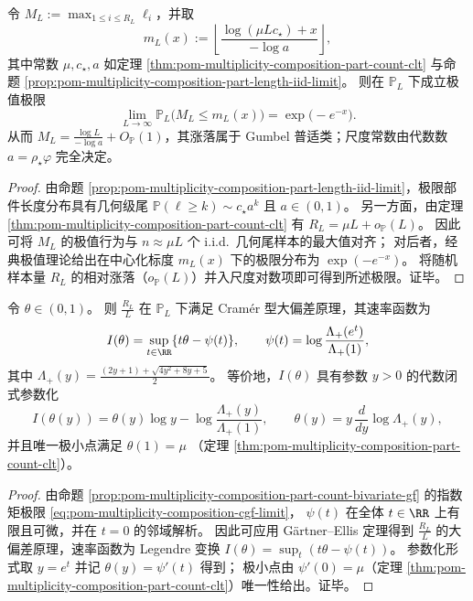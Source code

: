 \begin{theorem}\label{thm:pom-multiplicity-composition-max-part-gumbel}
令 \(M_L:=\max_{1\le i\le R_L}\ell_i\)，并取
\[
m_L(x):=\left\lfloor \frac{\log(\mu L c_\star)+x}{-\log a}\right\rfloor ,
\]
其中常数 \(\mu,c_\star,a\) 如定理 \ref{thm:pom-multiplicity-composition-part-count-clt} 与命题 \ref{prop:pom-multiplicity-composition-part-length-iid-limit}。
则在 \(\mathbb{P}_L\) 下成立极值极限
\[
\lim_{L\to\infty}\mathbb{P}_L\bigl(M_L\le m_L(x)\bigr)=\exp\bigl(-e^{-x}\bigr).
\]
从而
\(
M_L=\frac{\log L}{-\log a}+O_{\mathbb{P}}(1)
\)，其涨落属于 Gumbel 普适类；尺度常数由代数数 \(a=\rho_\star\varphi\) 完全决定。
\end{theorem}
\begin{proof}
由命题 \ref{prop:pom-multiplicity-composition-part-length-iid-limit}，极限部件长度分布具有几何级尾
\(
\mathbb{P}(\ell\ge k)\sim c_\star a^k
\) 且 \(a\in(0,1)\)。
另一方面，由定理 \ref{thm:pom-multiplicity-composition-part-count-clt} 有 \(R_L=\mu L+o_{\mathbb{P}}(L)\)。
因此可将 \(M_L\) 的极值行为与 \(n\approx \mu L\) 个 i.i.d.\ 几何尾样本的最大值对齐；
对后者，经典极值理论给出在中心化标度 \(m_L(x)\) 下的极限分布为 \(\exp(-e^{-x})\)。
将随机样本量 \(R_L\) 的相对涨落（\(o_{\mathbb{P}}(L)\)）并入尺度对数项即可得到所述极限。证毕。
\end{proof}

\begin{theorem}\label{thm:pom-multiplicity-composition-part-density-ldp}
令 \(\theta\in(0,1)\)。
则 \(\frac{R_L}{L}\) 在 \(\mathbb{P}_L\) 下满足 Cramér 型大偏差原理，其速率函数为
\[
I(\theta)=\sup_{t\in\RR}\{t\theta-\psi(t)\},
\qquad
\psi(t)=\log\frac{\Lambda_+(e^{t})}{\Lambda_+(1)},
\]
其中
\(
\Lambda_+(y)=\frac{(2y+1)+\sqrt{4y^2+8y+5}}{2}
\)。
等价地，\(I(\theta)\) 具有参数 \(y>0\) 的代数闭式参数化
\[
I(\theta(y))=\theta(y)\log y-\log\frac{\Lambda_+(y)}{\Lambda_+(1)},
\qquad
\theta(y)=y\,\frac{d}{dy}\log \Lambda_+(y),
\]
并且唯一极小点满足
\(
\theta(1)=\mu
\)
（定理 \ref{thm:pom-multiplicity-composition-part-count-clt}）。
\end{theorem}
\begin{proof}
由命题 \ref{prop:pom-multiplicity-composition-part-count-bivariate-gf} 的指数矩极限 \eqref{eq:pom-multiplicity-composition-cgf-limit}，
\(\psi(t)\) 在全体 \(t\in\RR\) 上有限且可微，并在 \(t=0\) 的邻域解析。
因此可应用 G\"artner--Ellis 定理得到 \(\frac{R_L}{L}\) 的大偏差原理，速率函数为 Legendre 变换
\(
I(\theta)=\sup_t(t\theta-\psi(t))
\)。
参数化形式取 \(y=e^t\) 并记 \(\theta(y)=\psi'(t)\) 得到；
极小点由 \(\psi'(0)=\mu\)（定理 \ref{thm:pom-multiplicity-composition-part-count-clt}）唯一性给出。证毕。
\end{proof}


